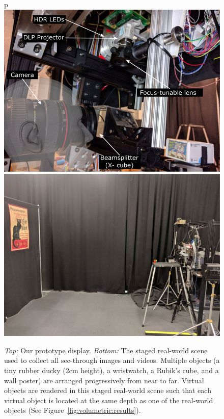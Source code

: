 \begin{figure}[htpb!]
\centering
p\includegraphics[width=0.8\columnwidth]{images/volumetric/setup}
\caption[Volumetric NED: Prototype and staged real-world scene for capturing results]{\emph{Top:} Our prototype display. \emph{Bottom:} The staged real-world scene used to collect all see-through images and videos. Multiple objects (a tiny rubber ducky (2cm height), a wristwatch, a Rubik's cube, and a wall poster) are arranged progressively from near to far. Virtual objects are rendered in this staged real-world scene such that each virtual object is located at the same depth as one of the real-world objects (See Figure~\ref{fig:volumetric:results}).}
\label{fig:volumetric:setup}
\end{figure}


